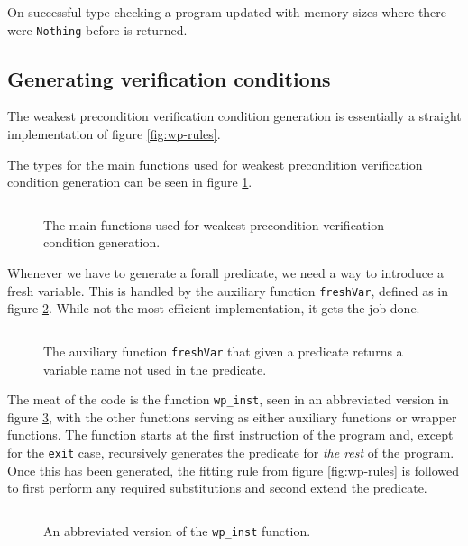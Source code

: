 On successful type checking a program updated with memory sizes where there were \texttt{Nothing} before is returned. 


\subsection{Generating verification conditions}
\label{subsec:generating_verification_conditions}
The weakest precondition verification condition generation is essentially a straight implementation of figure \ref{fig:wp-rules}.

The types for the main functions used for weakest precondition verification condition generation can be seen in figure \ref{snip:wp_prog_overview}.

\begin{figure}[ht]
  \centering
\inputminted[linenos,breaklines]{haskell}{snippets/wp_prog_overview.hs}
  \caption{The main functions used for weakest precondition verification condition generation.}
  \label{snip:wp_prog_overview}
\end{figure}

Whenever we have to generate a forall predicate, we need a way to introduce a fresh variable. This is handled by the auxiliary function \texttt{freshVar}, defined as in figure \ref{snip:fresh-var}. While not the most efficient implementation, it gets the job done.

\begin{figure}[ht]
  \centering
\inputminted[linenos]{haskell}{snippets/fresh-var.hs}
  \caption{The auxiliary function \texttt{freshVar} that given a predicate returns a variable name not used in the predicate.}
  \label{snip:fresh-var}
\end{figure}


The meat of the code is the function \texttt{wp\_inst}, seen in an abbreviated version in figure \ref{snip:wp_inst}, with the other functions serving as either auxiliary functions or wrapper functions. The function starts at the first instruction of the program and, except for the \texttt{exit} case, recursively generates the predicate for \textit{the rest} of the program. Once this has been generated, the fitting rule from figure \ref{fig:wp-rules} is followed to first perform any required substitutions and second extend the predicate.

\begin{figure}[ht]
  \centering
\inputminted[linenos,breaklines]{haskell}{snippets/wp_inst.hs}
  \caption{An abbreviated version of the \texttt{wp\_inst} function.}
  \label{snip:wp_inst}
\end{figure}



